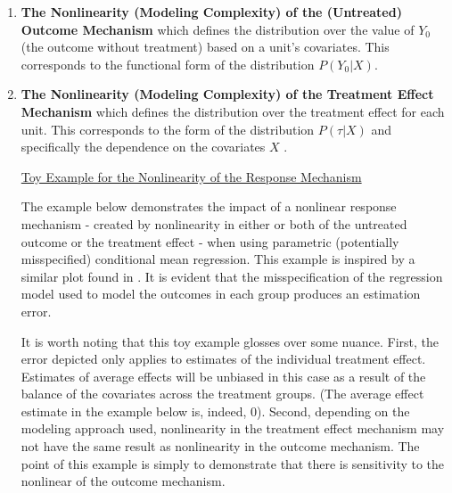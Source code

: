 \documentclass[../main.tex]{subfiles}
\begin{document}
\vspace{\baselineskip}
\begin{enumerate}
	\item \textbf{The Nonlinearity (Modeling Complexity) of the (Untreated) Outcome Mechanism} which defines the distribution over the value of  \( Y_{0} \)  (the outcome without treatment) based on a unit’s covariates. This corresponds to the functional form of the distribution  \( P \left( Y_{0}  \vert  X \right)  \). \par


\vspace{\baselineskip}
	\item \textbf{The Nonlinearity (Modeling Complexity) of the Treatment Effect Mechanism} which defines the distribution over the treatment effect for each unit. This corresponds to the form of the distribution  \( P \left(  \tau  \vert  X \right)  \)  and specifically the dependence on the covariates  \( X \) . \par

\uline{Toy Example for the Nonlinearity of the Response Mechanism}\par

\vspace{\baselineskip}

The example below demonstrates the impact of a nonlinear response mechanism - created by nonlinearity in either or both of the untreated outcome or the treatment effect - when using parametric (potentially misspecified) conditional mean regression. This example is inspired by a similar plot found in \textcite{Hill2011BayesianInference}. It is evident that the misspecification of the regression model used to model the outcomes in each group produces an estimation error.

\vspace{\baselineskip}

It is worth noting that this toy example glosses over some nuance. First, the error depicted only applies to estimates of the individual treatment effect. Estimates of average effects will be unbiased in this case as a result of the balance of the covariates across the treatment groups. (The average effect estimate in the example below is, indeed, 0). Second, depending on the modeling approach used, nonlinearity in the treatment effect mechanism may not have the same result as nonlinearity in the outcome mechanism. The point of this example is simply to demonstrate that there is sensitivity to the nonlinear of the outcome mechanism.


\end{enumerate}
\end{document}
